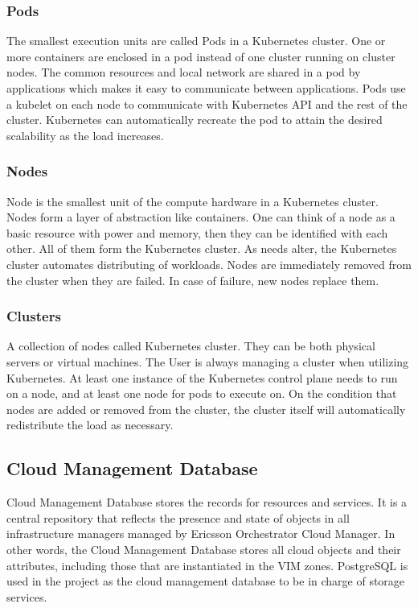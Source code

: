 \subsubsection{Pods}
The smallest execution units are called Pods in a Kubernetes cluster. One or more containers are enclosed in a pod instead of one cluster running on cluster nodes. The common resources and local network are shared in a pod by applications which makes it easy to communicate between applications. Pods use a kubelet on each node to communicate with Kubernetes API and the rest of the cluster. Kubernetes can automatically recreate the pod to attain the desired scalability as the load increases.

\subsubsection{Nodes}
Node is the smallest unit of the compute hardware in a Kubernetes cluster. Nodes form a layer of abstraction like containers. One can think of a node as a basic resource with power and memory, then they can be identified with each other. All of them form the Kubernetes cluster. As needs alter, the Kubernetes cluster automates distributing of workloads. Nodes are immediately removed from the cluster when they are failed. In case of failure, new nodes replace them.

\subsubsection{Clusters}
A collection of nodes called Kubernetes cluster. They can be both physical servers or virtual machines. The User is always managing a cluster when utilizing Kubernetes. At least one instance of the Kubernetes control plane needs to run on a node, and at least one node for pods to execute on. On the condition that nodes are added or removed from the cluster, the cluster itself will automatically redistribute the load as necessary.

\subsection{Cloud Management Database}
Cloud Management Database stores the records for resources and services. It is a central repository that reflects the presence and state of objects in all infrastructure managers managed by Ericsson Orchestrator Cloud Manager. In other words, the Cloud Management Database stores all cloud objects and their attributes, including those that are instantiated in the VIM zones. PostgreSQL is used in the project as the cloud management database to be in charge of storage services.

